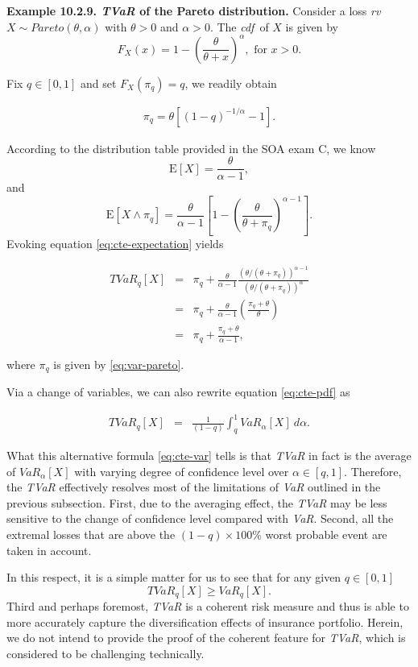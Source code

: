\documentclass[]{book}
\theoremstyle{definition}
\theoremstyle{definition}
\theoremstyle{definition}
\theoremstyle{remark}
\begin{document}
\textbf{Example 10.2.9. \emph{TVaR} of the Pareto distribution.}
Consider a loss \emph{rv}~\(X\sim Pareto(\theta,\alpha)\) with
\(\theta>0\) and \(\alpha>0\). The \emph{cdf}~of \(X\) is given by \[
F_X(x)=1-\left(\frac{\theta}{\theta+x} \right)^{\alpha}, \text{ for } x>0 .
\]

Fix \(q\in [0,1]\) and set \(F_X(\pi_q)=q\), we readily obtain

\begin{eqnarray}
\pi_q=\theta\left[(1-q)^{-1/\alpha}-1 \right].
\label{eq:var-pareto}
\end{eqnarray}

According to the distribution table provided in the SOA exam C, we know
\[
\mathrm{E}[X]=\frac{\theta}{\alpha-1},
\] and \[
\mathrm{E}[X\wedge \pi_q]=\frac{\theta}{\alpha-1}\left[
1-\left(\frac{\theta}{\theta+\pi_q}\right)^{\alpha-1}
\right].
\] Evoking equation \eqref{eq:cte-expectation} yields

\begin{eqnarray*}
  TVaR_q[X] &=& \pi_q+\frac{\theta}{\alpha-1} \frac{(\theta/(\theta+\pi_q))^{\alpha-1}}
{(\theta/(\theta+\pi_q))^{\alpha}}\\
&=&\pi_q +\frac{\theta}{\alpha-1}\left( \frac{\pi_q+\theta}{\theta} \right)\\
&=& \pi_q+\frac{\pi_q+\theta}{\alpha-1},
\end{eqnarray*}

where \(\pi_q\) is given by \eqref{eq:var-pareto}.

Via a change of variables, we can also rewrite equation \eqref{eq:cte-pdf}
as

\begin{eqnarray}
  TVaR_{q}[X] &=& \frac{1}{(1-q)}\int_{q}^{1} VaR_{\alpha}[X]\ d\alpha.
  \label{eq:cte-var}
\end{eqnarray}

What this alternative formula \eqref{eq:cte-var} tells is that \emph{TVaR}
in fact is the average of \(VaR_{\alpha}[X]\) with varying degree of
confidence level over \(\alpha\in [q,1]\). Therefore, the \emph{TVaR}
effectively resolves most of the limitations of \emph{VaR} outlined in
the previous subsection. First, due to the averaging effect, the
\emph{TVaR} may be less sensitive to the change of confidence level
compared with \emph{VaR}. Second, all the extremal losses that are above
the \((1-q)\times 100\%\) worst probable event are taken in account.

In this respect, it is a simple matter for us to see that for any given
\(q\in [0,1]\) \[
TVaR_q[X]\geq VaR_q[X].
\] Third and perhaps foremost, \emph{TVaR} is a coherent risk measure
and thus is able to more accurately capture the diversification effects
of insurance portfolio. Herein, we do not intend to provide the proof of
the coherent feature for \emph{TVaR}, which is considered to be
challenging technically.
\end{document}
